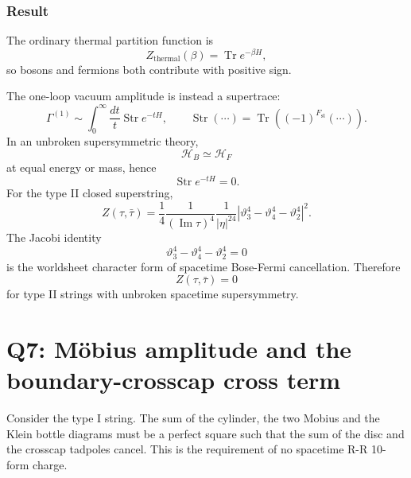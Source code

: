 \documentclass[
  10pt,
  a4paper,
  openany]{book}
\begin{document}
\subsubsection{Result}\label{result-9}

The ordinary thermal partition function is \[
Z_{\mathrm{thermal}}(\beta)
=
\operatorname{Tr}e^{-\beta H},
\] so bosons and fermions both contribute with positive sign.

The one-loop vacuum amplitude is instead a supertrace: \[
\Gamma^{(1)}
\sim
\int_0^\infty\frac{dt}{t}
\operatorname{Str}e^{-tH},
\qquad
\operatorname{Str}(\cdots)
=
\operatorname{Tr}\left((-1)^{F_{\mathrm{st}}}(\cdots)\right).
\] In an unbroken supersymmetric theory, \[
\mathcal H_B
\simeq
\mathcal H_F
\] at equal energy or mass, hence \[
\operatorname{Str}e^{-tH}
=
0.
\] For the type II closed superstring, \[
Z(\tau,\bar\tau)
=
\frac{1}{4}
\frac{1}{(\operatorname{Im}\tau)^4}
\frac{1}{|\eta|^{24}}
\left|
\vartheta_3^4-\vartheta_4^4-\vartheta_2^4
\right|^2.
\] The Jacobi identity \[
\vartheta_3^4-\vartheta_4^4-\vartheta_2^4=0
\] is the worldsheet character form of spacetime Bose-Fermi
cancellation. Therefore \[
\boxed{
Z(\tau,\bar\tau)=0
}
\] for type II strings with unbroken spacetime supersymmetry.

\section{Q7: Möbius amplitude and the boundary-crosscap cross
term}\label{q7-muxf6bius-amplitude-and-the-boundary-crosscap-cross-term}

Consider the type I string. The sum of the cylinder, the two Mobius and
the Klein bottle diagrams must be a perfect square such that the sum of
the disc and the crosscap tadpoles cancel. This is the requirement of no
spacetime R-R 10-form charge.
\end{document}

